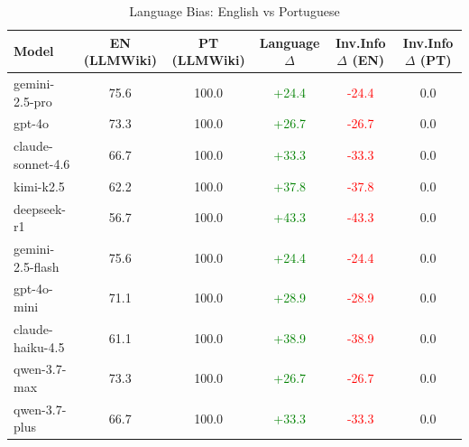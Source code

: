 \begin{table}[ht]
\centering
\caption{Language Bias: English vs Portuguese}
\label{tab:language_bias}
\begin{tabular}{@{}lccccc@{}}
\toprule
Model & EN (LLMWiki) & PT (LLMWiki) & Language $\Delta$ & Inv.Info $\Delta$ (EN) & Inv.Info $\Delta$ (PT) \\ 
\midrule
gemini-2.5-pro & 75.6 & 100.0 & \textcolor{green}{+24.4} & \textcolor{red}{-24.4} & 0.0 \\ 
gpt-4o & 73.3 & 100.0 & \textcolor{green}{+26.7} & \textcolor{red}{-26.7} & 0.0 \\ 
claude-sonnet-4.6 & 66.7 & 100.0 & \textcolor{green}{+33.3} & \textcolor{red}{-33.3} & 0.0 \\ 
kimi-k2.5 & 62.2 & 100.0 & \textcolor{green}{+37.8} & \textcolor{red}{-37.8} & 0.0 \\ 
deepseek-r1 & 56.7 & 100.0 & \textcolor{green}{+43.3} & \textcolor{red}{-43.3} & 0.0 \\ 
gemini-2.5-flash & 75.6 & 100.0 & \textcolor{green}{+24.4} & \textcolor{red}{-24.4} & 0.0 \\ 
gpt-4o-mini & 71.1 & 100.0 & \textcolor{green}{+28.9} & \textcolor{red}{-28.9} & 0.0 \\ 
claude-haiku-4.5 & 61.1 & 100.0 & \textcolor{green}{+38.9} & \textcolor{red}{-38.9} & 0.0 \\ 
qwen-3.7-max & 73.3 & 100.0 & \textcolor{green}{+26.7} & \textcolor{red}{-26.7} & 0.0 \\ 
qwen-3.7-plus & 66.7 & 100.0 & \textcolor{green}{+33.3} & \textcolor{red}{-33.3} & 0.0 \\ 
\bottomrule
\end{tabular}
\end{table}